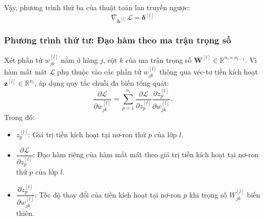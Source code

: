 Vậy, phương trình thứ ba của thuật toán lan truyền ngược:
\begin{equation}
\boxed{
\nabla_{\mathbf{b}^{[l]}}\mathcal{L} = \boldsymbol{\delta}^{[l]}
}
\label{eq:bp_bias_vector}
\end{equation}

\subsubsection{Phương trình thứ tư: Đạo hàm theo ma trận trọng số}

Xét phần tử $w_{jk}^{[l]}$ nằm ở hàng $j$, cột $k$ của ma trận trọng số $\mathbf{W}^{[l]} \in \mathbb{R}^{n_l \times n_{l-1}}$. Vì hàm mất mát $\mathcal{L}$ phụ thuộc vào các phần tử $w_{jk}^{[l]}$ thông qua véc-tơ tiền kích hoạt $\mathbf{z}^{[l]} \in \mathbb{R}^{n_l}$, áp dụng quy tắc chuỗi đa biến tổng quát:
\begin{equation}
\frac{\partial\mathcal{L}}{\partial w_{jk}^{[l]}} = \sum_{p=1}^{n_l} \frac{\partial\mathcal{L}}{\partial z_p^{[l]}} \frac{\partial z_p^{[l]}}{\partial w_{jk}^{[l]}}.
\label{eq:chain_weight}
\end{equation}
Trong đó:
\begin{itemize}
    \item $z_p^{[l]}$: Giá trị tiền kích hoạt tại nơ-ron thứ $p$ của lớp $l$.
    \item $\dfrac{\partial\mathcal{L}}{\partial z_p^{[l]}}$: Đạo hàm riêng của hàm mất mát theo giá trị tiền kích hoạt tại nơ-ron thứ $p$ của lớp $l$.
    \item $\dfrac{\partial z_p^{[l]}}{\partial w_{jk}^{[l]}}$: Tốc độ thay đổi của tiền kích hoạt tại nơ-ron $p$ khi trọng số $W_{jk}^{[l]}$ biến thiên.
\end{itemize}

